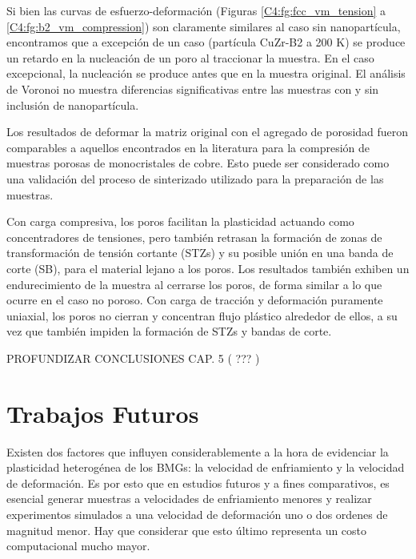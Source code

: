 Si bien las curvas de esfuerzo-deformación (Figuras \ref{C4:fg:fcc_vm_tension} a \ref{C4:fg:b2_vm_compression}) son claramente similares al caso sin nanopartícula, encontramos que a excepción de un caso (partícula CuZr-B2 a 200 K) se produce un retardo en la nucleación de un poro al traccionar la muestra. En el caso excepcional, la nucleación se produce antes que en la muestra original. El análisis de Voronoi no muestra diferencias significativas entre las muestras con y sin inclusión de nanopartícula. 

Los resultados de deformar la matriz original con el agregado de porosidad fueron comparables a aquellos encontrados en la literatura \citep{yuan14} para la compresión de muestras porosas de monocristales de cobre. Esto puede ser considerado como una validación del proceso de sinterizado utilizado para la preparación de las muestras.

Con carga compresiva, los poros facilitan la plasticidad actuando como concentradores de tensiones, pero también retrasan la formación de zonas de transformación de tensión cortante (STZs) y su posible unión en una banda de corte (SB), para el material lejano a los poros. Los resultados también exhiben un endurecimiento de la muestra al cerrarse los poros, de forma similar a lo que ocurre en el caso no poroso. Con carga de tracción y deformación puramente uniaxial, los poros no cierran y concentran flujo plástico alrededor de ellos, a su vez que también impiden la formación de STZs y bandas de corte.

PROFUNDIZAR CONCLUSIONES CAP. 5 ( ??? )


\section{Trabajos Futuros}

Existen dos factores que influyen considerablemente a la hora de evidenciar la plasticidad heterogénea de los BMGs: la velocidad de enfriamiento y la velocidad de deformación. Es por esto que en estudios futuros y a fines comparativos, es esencial generar muestras a velocidades de enfriamiento menores y realizar experimentos simulados a una velocidad de deformación uno o dos ordenes de magnitud menor. Hay que considerar que esto último representa un costo computacional mucho mayor.


